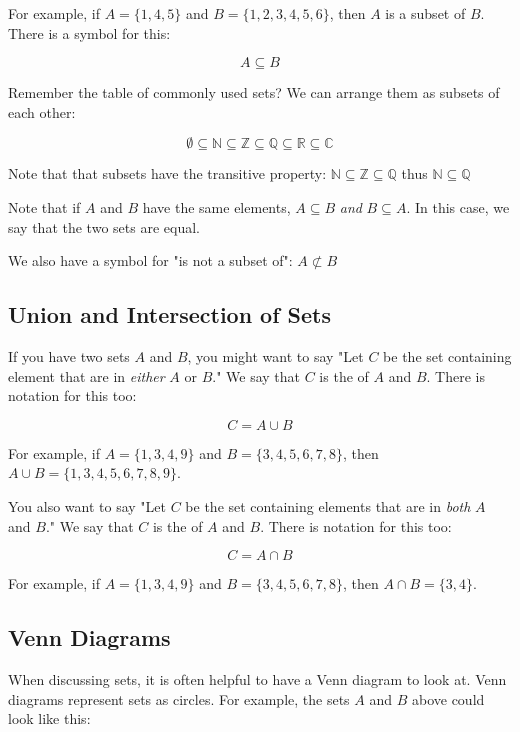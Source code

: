 For example, if $A = \{1,4,5\}$ and $B = \{1,2,3,4,5,6\}$, then $A$ is
a subset of $B$.  There is a symbol for this:

$$ A \subseteq B$$

Remember the table of commonly used sets?  We can arrange them as
subsets of each other:

$$\emptyset \subseteq \mathbb{N} \subseteq \mathbb{Z} \subseteq \mathbb{Q} \subseteq \mathbb{R} \subseteq \mathbb{C}$$

Note that that subsets have the transitive property: $\mathbb{N}
\subseteq \mathbb{Z} \subseteq \mathbb{Q}$ thus $\mathbb{N} \subseteq
\mathbb{Q}$

Note that if $A$ and $B$ have the same elements, $A \subseteq B$
\textit{ and } $B \subseteq A$. In this case, we say that the two sets
are equal.

We also have a symbol for "is not a subset of": $A \not\subset B$

\subsection{Union and Intersection of Sets}

If you have two sets $A$ and $B$, you might want to say "Let $C$ be
the set containing element that are in \textit{either} $A$ or $B$."
We say that $C$ is the  of $A$ and $B$.  There is
notation for this too:

$$C = A \cup B$$

For example,  if $A = \{1,3,4,9\}$ and $B = \{3,4,5,6,7,8\}$,  then $A \cup B =  \{1,3,4,5,6,7,8,9\}$.

You also want to say "Let $C$ be the set containing elements that are
in \textit{both} $A$ and $B$."  We say that $C$ is the
 of $A$ and $B$.  There is notation for this
too:

$$C = A \cap B$$

For example,  if $A = \{1,3,4,9\}$ and $B = \{3,4,5,6,7,8\}$,  then $A \cap B =  \{3,4\}$.

\subsection{Venn Diagrams}

When discussing sets, it is often helpful to have a Venn diagram to
look at.  Venn diagrams represent sets as circles. For example, the
sets $A$ and $B$ above could look like this:

